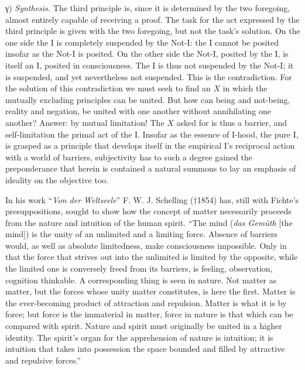 \documentclass[12pt]{book}
\begin{document}
γ) \emph{Synthesis.} The third principle is, since it is determined by the two
foregoing, almost entirely capable of receiving a proof. The task for the act
expressed by the third principle is given with the two foregoing, but not the
task's solution. On the one side the I is completely suspended by the Not-I: the I
cannot be posited insofar as the Not-I is posited. On the other side the Not-I,
posited by the I, is itself an I, posited in consciousness. The I is thus not
suspended by the Not-I; it is suspended, and yet nevertheless not suspended. This
is the contradiction. For the solution of this contradiction we must seek to find
an $X$ in which the mutually excluding principles can be united. But how can being
and not-being, reality and negation, be united with one another without
annihilating one another? Answer: by mutual limitation! The $X$ asked for is thus a
barrier, and self-limitation the primal act of the I.
Insofar as the essence of I-hood, the pure I, is grasped as a principle that
develops itself in the empirical I's reciprocal action with a world of barriers,
subjectivity has to such a degree gained the preponderance that herein is
contained a natural summons to lay an emphasis of ideality on the objective too.

In his work ``\textit{Von der Weltseele}'' F. W. J. Schelling (†1854) has, still
with Fichte's presuppositions, sought to show how the concept of matter
necessarily proceeds from the nature and intuition of the human spirit. ``The mind
(\textit{das Gemüth} [the mind]) is the unity of an unlimited and a limiting force.
Absence of barriers would, as well as absolute limitedness, make consciousness
impossible. Only in that the force that strives out into the unlimited is limited
by the opposite, while the limited one is conversely freed from its barriers, is
feeling, observation, cognition thinkable. A corresponding thing is seen in nature.
Not matter as matter, but the forces whose unity matter constitutes, is here the
first. Matter is the ever-becoming product of attraction and repulsion. Matter is
what it is by force; but force is the immaterial in matter, force in nature is that
which can be compared with spirit. Nature and spirit must originally be united in a
higher identity. The spirit's organ for the apprehension of nature is intuition; it
is intuition that takes into possession the space bounded and filled by attractive
and repulsive forces.''
\end{document}
